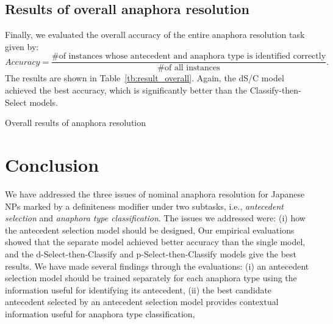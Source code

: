 \documentclass[english]{jnlp_1.4}
\newcommand{\wire}[1]{}
\begin{document}
\subsection{Results of overall anaphora resolution}

Finally, we evaluated the overall accuracy of the entire anaphora
resolution task given by:
$$ Accuracy = \frac{\mbox{\# of instances whose antecedent and anaphora type is identified correctly}}{\mbox{\# of all instances}}.$$
The results are shown in Table~\ref{tb:result_overall}. Again, the
dS/C model achieved the best accuracy, which is significantly better
than the Classify-then-Select models.

\begin{table}[t]
\caption{Overall results of anaphora resolution}
 \label{tb:result_overall}

\end{table}



\section{Conclusion}

We have addressed the three issues of nominal anaphora resolution for
Japanese NPs marked by a definiteness modifier under two subtasks,
i.e., \emph{antecedent selection} and \emph{anaphora type
  classification}. The issues we addressed were: (i) how the
antecedent selection model should be designed, \wire{(ii) what
  information helps anaphora type classification, and (iii) how the
  antecedent selection and anaphora type classification should be
  carried out.} Our empirical evaluations showed that the separate
model achieved better accuracy than the single model, and the
d-Select-then-Classify and p-Select-then-Classify models give the best
results. We have made several findings through the evaluations: (i) an
antecedent selection model should be trained separately for each
anaphora type using the information useful for identifying its
antecedent, (ii) the best candidate antecedent selected by an
antecedent selection model provides contextual information useful for
anaphora type classification, \wire{and (iii) the antecedent selection
  should be carried out before anaphora type classification.}
\end{document}
